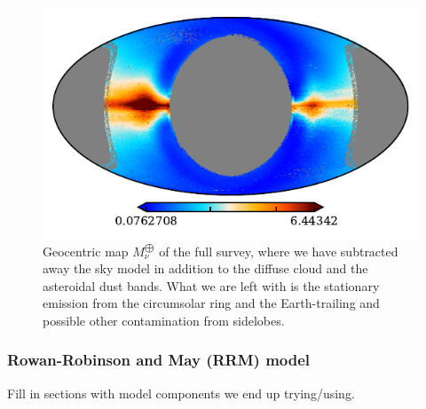 \documentclass{aa}
\begin{document}
\begin{figure}
    \centering
    \includegraphics[width=\columnwidth]{figs/zodi_static.pdf}
    \caption{Geocentric map $M^{\bigoplus}_\nu$ of the full survey, where we have subtracted away the sky model in addition to the diffuse cloud and the asteroidal dust bands. What we are left with is the stationary emission from the circumsolar ring and the Earth-trailing and possible other contamination from sidelobes.}
    \label{fig: geomap}
\end{figure}

\subsubsection{Rowan-Robinson and May (RRM) model}
Fill in sections with model components we end up trying/using.
\end{document}
